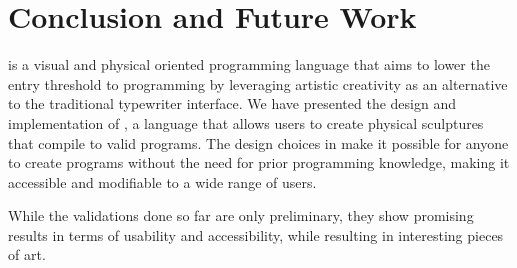
\section{Conclusion and Future Work}
\label{sec:conclusion}
\sculpt is a visual and physical oriented programming language that aims to lower the entry threshold to programming by leveraging artistic creativity as an alternative to the traditional typewriter interface.
We have presented the design and implementation of \sculpt, a language that allows users to create physical sculptures that compile to valid programs.
The design choices in \sculpt make it possible for anyone to create programs without the need for prior programming knowledge, making it accessible and modifiable to a wide range of users.

While the validations done so far are only preliminary, they show promising results in terms of usability and accessibility, while resulting in interesting pieces of art.

\endinput

